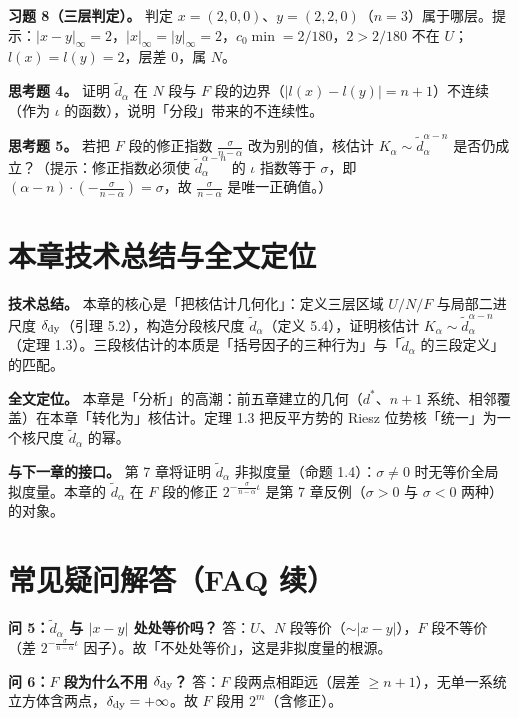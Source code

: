 \documentclass[a4paper,11pt,openany]{ctexbook}
\numberwithin{equation}{chapter}
\numberwithin{figure}{chapter}
\numberwithin{table}{chapter}
\begin{document}
\textbf{习题 8（三层判定）。} 判定 $x=(2,0,0)$、$y=(2,2,0)$（$n=3$）属于哪层。提示：$|x-y|_\infty=2$，$|x|_\infty=|y|_\infty=2$，$c_0\min=2/180$，$2>2/180$ 不在 $U$；$l(x)=l(y)=2$，层差 $0$，属 $N$。

\textbf{思考题 4。} 证明 $\widetilde d_\alpha$ 在 $N$ 段与 $F$ 段的边界（$|l(x)-l(y)|=n+1$）不连续（作为 $\iota$ 的函数），说明「分段」带来的不连续性。

\textbf{思考题 5。} 若把 $F$ 段的修正指数 $\frac{\sigma}{n-\alpha}$ 改为别的值，核估计 $K_\alpha\sim\widetilde d_\alpha^{\alpha-n}$ 是否仍成立？（提示：修正指数必须使 $\widetilde d_\alpha^{\alpha-n}$ 的 $\iota$ 指数等于 $\sigma$，即 $(\alpha-n)\cdot(-\frac{\sigma}{n-\alpha})=\sigma$，故 $\frac{\sigma}{n-\alpha}$ 是唯一正确值。）

\section{本章技术总结与全文定位}

\textbf{技术总结。} 本章的核心是「把核估计几何化」：定义三层区域 $U/N/F$ 与局部二进尺度 $\delta_{\rm dy}$（引理 5.2），构造分段核尺度 $\widetilde d_\alpha$（定义 5.4），证明核估计 $K_\alpha\sim\widetilde d_\alpha^{\alpha-n}$（定理 1.3）。三段核估计的本质是「括号因子的三种行为」与「$\widetilde d_\alpha$ 的三段定义」的匹配。

\textbf{全文定位。} 本章是「分析」的高潮：前五章建立的几何（$d^*$、$n+1$ 系统、相邻覆盖）在本章「转化为」核估计。定理 1.3 把反平方势的 Riesz 位势核「统一」为一个核尺度 $\widetilde d_\alpha$ 的幂。

\textbf{与下一章的接口。} 第 7 章将证明 $\widetilde d_\alpha$ 非拟度量（命题 1.4）：$\sigma\neq0$ 时无等价全局拟度量。本章的 $\widetilde d_\alpha$ 在 $F$ 段的修正 $2^{-\frac{\sigma}{n-\alpha}\iota}$ 是第 7 章反例（$\sigma>0$ 与 $\sigma<0$ 两种）的对象。

\section{常见疑问解答（FAQ 续）}

\textbf{问 5：$\widetilde d_\alpha$ 与 $|x-y|$ 处处等价吗？} 答：$U$、$N$ 段等价（$\sim|x-y|$），$F$ 段不等价（差 $2^{-\frac{\sigma}{n-\alpha}\iota}$ 因子）。故「不处处等价」，这是非拟度量的根源。

\textbf{问 6：$F$ 段为什么不用 $\delta_{\rm dy}$？} 答：$F$ 段两点相距远（层差 $\ge n+1$），无单一系统立方体含两点，$\delta_{\rm dy}=+\infty$。故 $F$ 段用 $2^m$（含修正）。
\end{document}
